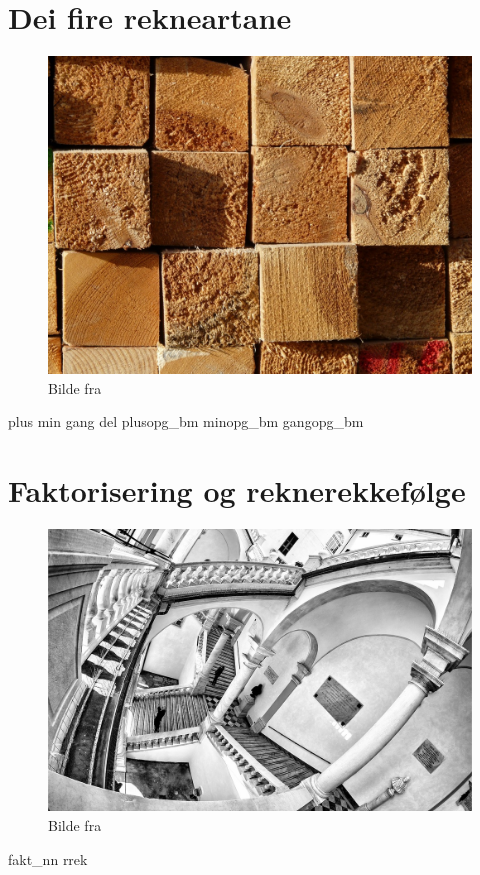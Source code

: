 \chapter{Dei fire rekneartane \label{Rekneartane}}
\begin{figure}
	\centering
	\includegraphics[scale=0.38]{wood} \\
	{\footnotesize Bilde fra } 
\end{figure}
\newpage
{plus}
{min}
{gang}
{del}
\opgt
{plusopg_bm}
{minopg_bm}
{gangopg_bm}

\chapter{Faktorisering og reknerekkefølge \label{Faktogreknrekflg}}
\begin{figure}
	\centering
	\includegraphics[scale=0.2]{escher} \\
	{\footnotesize Bilde fra } 
\end{figure}
\newpage
{fakt_nn}
{rrek}

